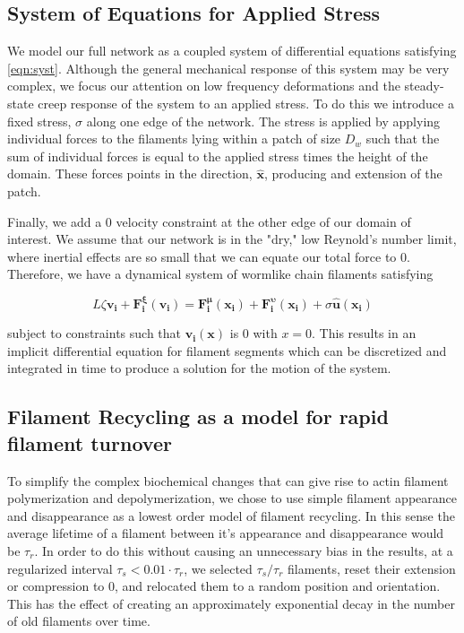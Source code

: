 \documentclass[10pt,letterpaper]{article}
\begin{document}
\subsection*{System of Equations for Applied Stress}
We model our full network as a coupled system of differential equations satisfying \ref{eqn:syst}.  Although the general mechanical response of this system may be very complex, we focus our attention on low frequency deformations and the steady-state creep response of the system to an applied stress.  To do this we introduce a fixed stress, $\sigma$ along one edge of the network.  The stress is applied by applying individual forces to the filaments lying within a patch of size $D_w$ such that the sum of individual forces is equal to the applied stress times the height of the domain.  These forces points in the direction, $\mathbf{\hat{x}}$, producing and extension of the patch.

Finally, we add a 0 velocity constraint at the other edge of our domain of interest.  We assume that our network is in the "dry," low Reynold's number limit, where inertial effects are so small that we can equate our total force to 0.  Therefore, we have a dynamical system of wormlike chain filaments satisfying

\begin{equation}
L\zeta\mathbf{ v_i} +\mathbf{F^{\xi}_i(v_i)}= \mathbf{F^{\mu}_i(x_i)}+\mathbf{F^{\upsilon}_i(x_i)} + \sigma\mathbf{\hat{u}(x_i)}
\end{equation}

subject to constraints such that $\mathbf{v_i(x)}$ is 0 with $x=0$.  This results in an implicit differential equation for filament segments which can be discretized and integrated in time to produce a solution for the motion of the system.


\subsection*{Filament Recycling as a model for rapid filament turnover}

To simplify the complex biochemical changes that can give rise to actin filament polymerization and depolymerization, we chose to use simple filament appearance and disappearance as a lowest order model of filament recycling.  In this sense the average lifetime of a filament between it's appearance and disappearance would be $\tau_r$.  In order to do this without causing an unnecessary bias in the results, at a regularized interval $\tau_s < 0.01\cdot\tau_r$, we selected $\tau_s/\tau_r$ filaments, reset their extension or compression to 0, and relocated them to a random position and orientation.  This has the effect of creating an approximately exponential decay in the number of old filaments over time.
\end{document}
